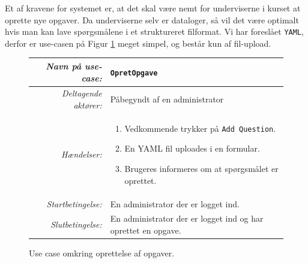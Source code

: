 \documentclass[11pt, a4paper]{article}
\begin{document}
Et af kravene for systemet er, at det skal være nemt for underviserne i kurset at oprette nye opgaver. Da underviserne selv er dataloger, så vil det være optimalt hvis man kan lave spørgsmålene i et struktureret filformat. Vi har foreslået \verb!YAML!, derfor er use-casen på Figur \ref{fig:use_case3} meget simpel, og består kun af fil-upload.
\begin{figure}[h!]
    \centering
    \begin{tabular}{r p{8cm}}
        \toprule
        \textit{Navn på use-case:} & \verb!OpretOpgave! \\
        \hline
        \textit{Deltagende aktører:} & Påbegyndt af en administrator \\
        \hline
        \textit{Hændelser:} & \begin{enumerate}[nolistsep]
            \item Vedkommende trykker på \verb!Add Question!.
            \item En YAML fil uploades i en formular.
            \item Brugeres informeres om at spørgsmålet er oprettet.
        \end{enumerate}  \\
        \hline
        \textit{Startbetingelse:} & En administrator der er logget ind. \\
        \hline
        \textit{Slutbetingelse:} & En administrator der er logget ind og har oprettet en opgave. \\
        \bottomrule
    \end{tabular}
    \caption{Use case omkring oprettelse af opgaver.}
    \label{fig:use_case3}
\end{figure}
\end{document}
